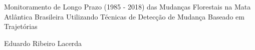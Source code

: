 \documentclass[12pt,a4paper]{article}
\begin{document}

\begin{titlepage}
    \centering
    \vspace*{\fill}

    \vspace*{0.5cm}

    \Large%
    Monitoramento de Longo Prazo (1985 - 2018) das Mudanças Florestais na Mata Atlântica Brasileira Utilizando Técnicas de Detecção de Mudança Baseado em Trajetórias

    \vspace*{5cm}

    \large Eduardo Ribeiro Lacerda

    \vspace*{\fill}
\end{titlepage}

\newpage
\tableofcontents

\newpage
\listoffigures
\newpage


\newpage


\newpage


\newpage


\newpage


%


\newpage

\end{document}
